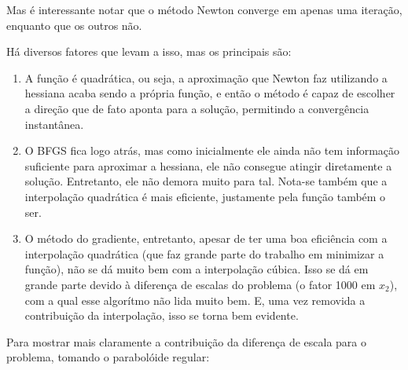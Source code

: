 \documentclass[a4paper,11pt]{article}
\begin{document}
        Mas é interessante notar que o método Newton converge em apenas uma iteração, enquanto que os outros não.

        Há diversos fatores que levam a isso, mas os principais são:
        \begin{enumerate}
            \item A função é quadrática, ou seja, a aproximação que Newton faz utilizando a hessiana acaba sendo a própria função, e então o método é capaz de escolher a direção que de fato aponta para a solução, permitindo a convergência instantânea.
            \item O BFGS fica logo atrás, mas como inicialmente ele ainda não tem informação suficiente para aproximar a hessiana, ele não consegue atingir diretamente a solução. Entretanto, ele não demora muito para tal. Nota-se também que a interpolação quadrática é mais eficiente, justamente pela função também o ser.
            \item O método do gradiente, entretanto, apesar de ter uma boa eficiência com a interpolação quadrática (que faz grande parte do trabalho em minimizar a função), não se dá muito bem com a interpolação cúbica. Isso se dá em grande parte devido à diferença de escalas do problema (o fator 1000 em $x_2$), com a qual esse algorítmo não lida muito bem. E, uma vez removida a contribuição da interpolação, isso se torna bem evidente.
        \end{enumerate}

        Para mostrar mais claramente a contribuição da diferença de escala para o problema, tomando o parabolóide regular:
\end{document}

